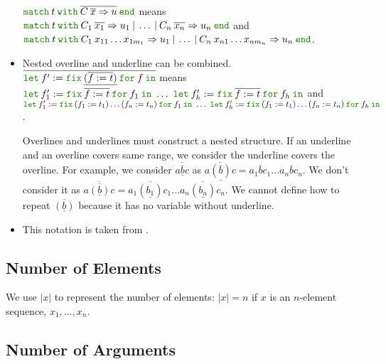 \documentclass[a4paper,fleqn]{article}
\newcommand{\kwlet}{\mbox{\color{mygreen}\ttfamily let}}
\newcommand{\kwin}{\mbox{\color{mygreen}\ttfamily in}}
\newcommand{\kwmatch}{\mbox{\color{mygreen}\ttfamily match}}
\newcommand{\kwwith}{\mbox{\color{mygreen}\ttfamily with}}
\newcommand{\kwend}{\mbox{\color{mygreen}\ttfamily end}}
\newcommand{\kwfix}{\mbox{\color{mygreen}\ttfamily fix}}
\newcommand{\kwfor}{\mbox{\color{mygreen}\ttfamily for}}
\newcommand{\letinB}[2]{\kwlet\:#1:=#2\:\kwin}
\newcommand{\omatch}[2]{\kwmatch\:#1\:\kwwith\:{#2}\:\kwend}
\newcommand{\ofix}[2]{\kwfix\:{#1}\:\kwfor\:{#2}}
\newcommand{\rep}[1]{\overline{#1}}
\begin{document}
\begin{itemize}
    $\omatch{t}{\rep{C\:\rep{x}\Rightarrow u}}$ means \\
    $\omatch{t}{C_1\:\rep{x_1}\Rightarrow u_1 \:|\: \ldots \:|\: C_n\:\rep{x_n}\Rightarrow u_n}$ and \\
    $\omatch{t}{C_1\: x_{11}\ldots x_{1m_1} \Rightarrow u_1
                \:|\: \ldots
                \:|\: C_n\: x_{n1}\ldots x_{nm_n} \Rightarrow u_n}$.
  \item Nested overline and underline can be combined. \\
    $\rep{\letinB{f'}{\ofix{\underline{(\rep{f:=t})}}{f}}}$ means \\
    $\letinB{f'_1}{\ofix{\rep{f:=t}}{f_1}} ~\ldots~
     \letinB{f'_h}{\ofix{\rep{f:=t}}{f_h}}$ and \\
    $\letinB{f'_1}{\ofix{(f_1:=t_1)\ldots(f_n:=t_n)}{f_1}} ~\ldots~
     \letinB{f'_h}{\ofix{(f_1:=t_1)\ldots(f_n:=t_n)}{f_h}}$.

    Overlines and underlines must construct a nested structure.
    If an underline and an overline covers same range,
    we consider the underline covers the overline.
    For example,
    we consider $\rep{a \rep{\underline{b}} c}$ as
    $\rep{a \underline{(\rep{b})} c} = a_1 \rep{b} c_1 \ldots a_n \rep{b} c_n$.
    We don't consider it as
    $\rep{a \rep{(\underline{b})} c} = a_1 \rep{(\underline{b_1})} c_1 \ldots a_n \rep{(\underline{b_n})} c_n$.
    We cannot define how to repeat $\rep{(\underline{b})}$ because it has no variable without underline.

  \item This notation is taken from \cite{steele2017s}.
\end{itemize}

\subsection{Number of Elements}

We use $|x|$ to represent the number of elements: $|x|=n$ if $x$ is an $n$-element sequence, $x_1, \ldots, x_n$.

\subsection{Number of Arguments}
\end{document}
